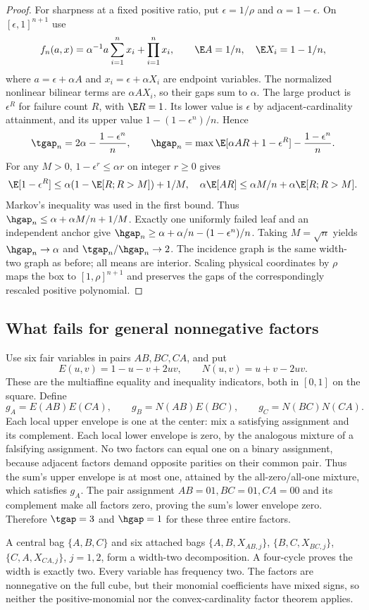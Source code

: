 \begin{proof}
For sharpness at a fixed positive ratio, put $\epsilon=1/\rho$ and
$\alpha=1-\epsilon$. On $[\epsilon,1]^{n+1}$ use
\[
 f_n(a,x)=\alpha^{-1}a\sum_{i=1}^nx_i+\prod_{i=1}^nx_i,
 \qquad \E A=1/n,\quad\E X_i=1-1/n,
\]
where $a=\epsilon+\alpha A$ and $x_i=\epsilon+\alpha X_i$ are endpoint
variables. The normalized nonlinear bilinear terms are $\alpha AX_i$,
so their gaps sum to $\alpha$. The large product is $\epsilon^R$ for
failure count $R$, with $\E R=1$. Its lower value is $\epsilon$ by
adjacent-cardinality attainment, and its upper value
$1-(1-\epsilon^n)/n$. Hence
\[
 \tgap_n=2\alpha-\frac{1-\epsilon^n}{n},\qquad
 \hgap_n=\max\E[\alpha AR+1-\epsilon^R]-\frac{1-\epsilon^n}{n}.
\]
For any $M>0$, $1-\epsilon^r\le\alpha r$ on integer $r\ge0$ gives
\[
 \E[1-\epsilon^R]\le\alpha(1-\E[R;R>M])+1/M,
 \quad \alpha\E[AR]\le\alpha M/n+\alpha\E[R;R>M].
\]
Markov's inequality was used in the first bound. Thus
$\hgap_n\le\alpha+\alpha M/n+1/M$. Exactly one uniformly failed leaf
and an independent anchor give
$\hgap_n\ge\alpha+\alpha/n-(1-\epsilon^n)/n$.
Taking $M=\sqrt n$ yields $\hgap_n\to\alpha$ and
$\tgap_n/\hgap_n\to2$. The incidence graph is the same width-two graph
as before; all means are interior. Scaling physical coordinates by
$\rho$ maps the box to $[1,\rho]^{n+1}$ and preserves the gaps of the
correspondingly rescaled positive polynomial.
\end{proof}

\subsection{What fails for general nonnegative factors}
\begin{example}\label{ex:parity-three}
Use six fair variables in pairs $AB,BC,CA$, and put
\[
 E(u,v)=1-u-v+2uv,\qquad N(u,v)=u+v-2uv.
\]
These are the multiaffine equality and inequality indicators, both in
$[0,1]$ on the square. Define
\[
 g_A=E(AB)E(CA),\qquad g_B=N(AB)E(BC),\qquad g_C=N(BC)N(CA).
\]
Each local upper envelope is one at the center: mix a satisfying
assignment and its complement. Each local lower envelope is zero,
by the analogous mixture of a falsifying assignment. No two factors
can equal one on a binary assignment, because adjacent factors demand
opposite parities on their common pair. Thus the sum's upper envelope
is at most one, attained by the all-zero/all-one mixture, which
satisfies $g_A$. The pair assignment $AB=01,BC=01,CA=00$ and its
complement make all factors zero, proving the sum's lower envelope
zero. Therefore $\tgap=3$ and $\hgap=1$ for these three entire factors.

A central bag $\{A,B,C\}$ and six attached bags
$\{A,B,X_{AB,j}\}$, $\{B,C,X_{BC,j}\}$, $\{C,A,X_{CA,j}\}$,
$j=1,2$, form a width-two decomposition. A four-cycle proves the width
is exactly two. Every variable has frequency two. The factors are
nonnegative on the full cube, but their monomial coefficients have mixed
signs, so neither the positive-monomial nor the convex-cardinality
factor theorem applies.
\end{example}

